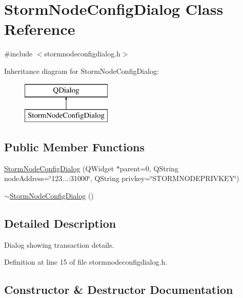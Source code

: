 \hypertarget{class_storm_node_config_dialog}{}\section{Storm\+Node\+Config\+Dialog Class Reference}
\label{class_storm_node_config_dialog}


{\ttfamily \#include $<$stormnodeconfigdialog.\+h$>$}

Inheritance diagram for Storm\+Node\+Config\+Dialog\+:\begin{figure}[H]
\begin{center}
\leavevmode
\includegraphics[height=2.000000cm]{class_storm_node_config_dialog}
\end{center}
\end{figure}
\subsection*{Public Member Functions}
\begin{DoxyCompactItemize}
\item 
\hyperlink{class_storm_node_config_dialog_a3b0f937188d6cc693a80fe1c9a90cf7e}{Storm\+Node\+Config\+Dialog} (Q\+Widget $\ast$parent=0, Q\+String node\+Address=\char`\"{}123...\+:31000\char`\"{}, Q\+String privkey=\char`\"{}S\+T\+O\+R\+M\+N\+O\+D\+E\+P\+R\+I\+V\+K\+E\+Y\char`\"{})
\item 
\hyperlink{class_storm_node_config_dialog_afd06075cb67f1a92bc6346d08f0b786f}{$\sim$\+Storm\+Node\+Config\+Dialog} ()
\end{DoxyCompactItemize}


\subsection{Detailed Description}
Dialog showing transaction details. 

Definition at line 15 of file stormnodeconfigdialog.\+h.



\subsection{Constructor \& Destructor Documentation}
\hypertarget{class_storm_node_config_dialog_a3b0f937188d6cc693a80fe1c9a90cf7e}{}

